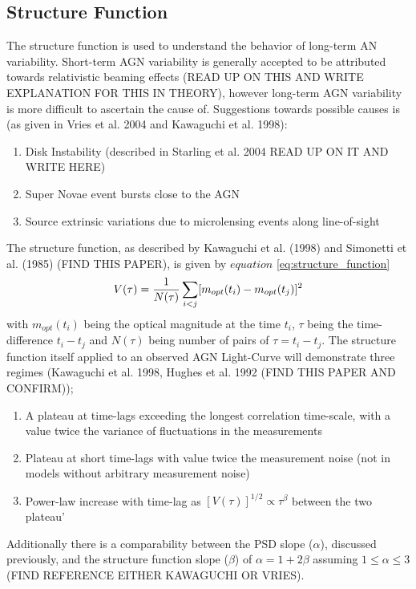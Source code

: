 \documentclass[a4paper, 12pt, twoside]{article}
\begin{document}
\subsection{Structure Function} \label{Structure_Function}
The structure function is used to understand the behavior of long-term AN variability. Short-term AGN variability is generally accepted to be attributed towards relativistic beaming effects (READ UP ON THIS AND WRITE EXPLANATION FOR THIS IN THEORY), however long-term AGN variability is more difficult to ascertain the cause of. Suggestions towards possible causes is (as given in Vries et al. 2004 and Kawaguchi et al. 1998):
\begin{enumerate}
\item Disk Instability (described in Starling et al. 2004 READ UP ON IT AND WRITE HERE)
\item Super Novae event bursts close to the AGN 
\item Source extrinsic variations due to microlensing events along line-of-sight
\end{enumerate}
The structure function, as described by Kawaguchi et al. (1998) and Simonetti et al. (1985) (FIND THIS PAPER), is given by $equation$ \ref{eq:structure_function}
\begin{equation}
V(\tau) = \frac{1}{N(\tau)}\sum_{\mathclap{i<j}}[m_{opt}(t_{i})-m_{opt}(t_{j})]^{2}
\label{eq:structure_function}
\end{equation}
with $m_{opt}(t_{i})$ being the optical magnitude at the time $t_{i}$, $\tau$ being the time-difference $t_{i}-t_{j}$ and $N(\tau)$ being number of pairs of $\tau = t_{i}-t_{j}$. The structure function itself applied to an observed AGN Light-Curve will demonstrate three regimes (Kawaguchi et al. 1998, Hughes et al. 1992 (FIND THIS PAPER AND CONFIRM));
\begin{enumerate}
\item A plateau at time-lags exceeding the longest correlation time-scale, with a value twice the variance of fluctuations in the measurements 
\item Plateau at short time-lags with value twice the measurement noise (not in models without arbitrary measurement noise)
\item Power-law increase with time-lag as $[V(\tau)]^{1/2}\propto \tau^{\beta}$ between the two plateau'
\end{enumerate}
Additionally there is a comparability between the PSD slope ($\alpha$), discussed previously, and the structure function slope ($\beta$) of $\alpha=1+2\beta$ assuming $1\le\alpha\le3$ (FIND REFERENCE EITHER KAWAGUCHI OR VRIES).
\end{document}
